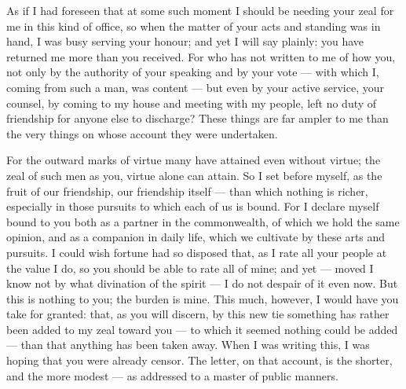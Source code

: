 

 As if I had foreseen that at some such moment I should be needing your zeal for me in this kind of office, so when the matter of your acts and standing was in hand, I was busy serving your honour; and yet I will say plainly: you have returned me more than you received. For who has not written to me of how you, not only by the authority of your speaking and by your vote --- with which I, coming from such a man, was content --- but even by your active service, your counsel, by coming to my house and meeting with my people, left no duty of friendship for anyone else to discharge? These things are far ampler to me than the very things on whose account they were undertaken.

 For the outward marks of virtue many have attained even without virtue; the zeal of such men as you, virtue alone can attain. So I set before myself, as the fruit of our friendship, our friendship itself --- than which nothing is richer, especially in those pursuits to which each of us is bound. For I declare myself bound to you both as a partner in the commonwealth, of which we hold the same opinion, and as a companion in daily life, which we cultivate by these arts and pursuits. I could wish fortune had so disposed that, as I rate all your people at the value I do, so you should be able to rate all of mine; and yet --- moved I know not by what divination of the spirit --- I do not despair of it even now. But this is nothing to you; the burden is mine. This much, however, I would have you take for granted: that, as you will discern, by this new tie something has rather been added to my zeal toward you --- to which it seemed nothing could be added --- than that anything has been taken away. When I was writing this, I was hoping that you were already censor. The letter, on that account, is the shorter, and the more modest --- as addressed to a master of public manners.
